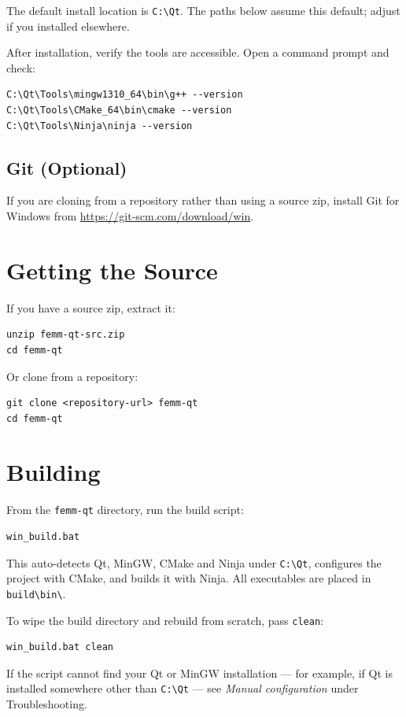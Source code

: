 \documentclass[11pt]{article}
\begin{document}
The default install location is \texttt{C:\textbackslash Qt}.  The paths
below assume this default; adjust if you installed elsewhere.

After installation, verify the tools are accessible.  Open a command
prompt and check:
\begin{lstlisting}
C:\Qt\Tools\mingw1310_64\bin\g++ --version
C:\Qt\Tools\CMake_64\bin\cmake --version
C:\Qt\Tools\Ninja\ninja --version
\end{lstlisting}

\subsection{Git (Optional)}

If you are cloning from a repository rather than using a source zip,
install Git for Windows from \url{https://git-scm.com/download/win}.

\section{Getting the Source}

If you have a source zip, extract it:
\begin{lstlisting}
unzip femm-qt-src.zip
cd femm-qt
\end{lstlisting}

Or clone from a repository:
\begin{lstlisting}
git clone <repository-url> femm-qt
cd femm-qt
\end{lstlisting}

\section{Building}

From the \texttt{femm-qt} directory, run the build script:
\begin{lstlisting}
win_build.bat
\end{lstlisting}

This auto-detects Qt, MinGW, CMake and Ninja under \texttt{C:\textbackslash Qt},
configures the project with CMake, and builds it with Ninja.  All
executables are placed in \texttt{build\textbackslash bin\textbackslash}.

To wipe the build directory and rebuild from scratch, pass
\texttt{clean}:
\begin{lstlisting}
win_build.bat clean
\end{lstlisting}

If the script cannot find your Qt or MinGW installation --- for
example, if Qt is installed somewhere other than \texttt{C:\textbackslash Qt}
--- see \textit{Manual configuration} under Troubleshooting.
\end{document}
